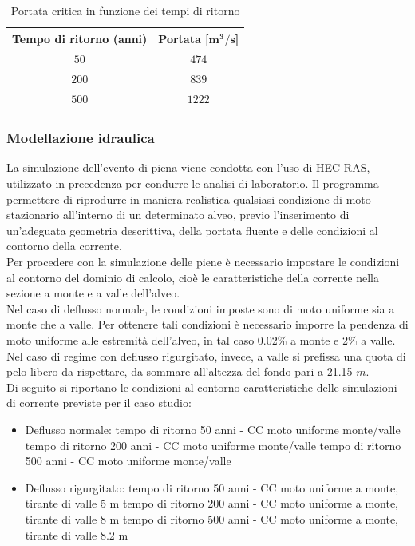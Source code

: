 \documentclass[12pt]{article} %
\begin{document}
\begin{table}[H]
    \centering
    \begin{tabular}{cc}
        \hline
        \textbf{Tempo di ritorno (anni)} & \textbf{Portata [$\mathbf{m^3/s}$]}\\
        \hline
        $50$ & $474$\\
        $200$ & $839$ \\
        $500$ & $1222$\\
        \hline
    \end{tabular}
    \caption{Portata critica in funzione dei tempi di ritorno}
\end{table}

\subsubsection{Modellazione idraulica}
\noindent La simulazione dell'evento di piena viene condotta con l'uso di HEC-RAS, utilizzato in precedenza per condurre le analisi di laboratorio. Il programma permettere di riprodurre in maniera realistica qualsiasi condizione di moto stazionario all'interno di un determinato alveo, previo l'inserimento di un'adeguata geometria descrittiva, della portata fluente e delle condizioni al contorno della corrente.\\
Per procedere con la simulazione delle piene è necessario impostare le condizioni al contorno del dominio di calcolo, cioè le caratteristiche della corrente nella sezione a monte e a valle dell'alveo.\\
Nel caso di deflusso normale, le condizioni imposte sono di moto uniforme sia a monte che a valle. Per ottenere tali condizioni è necessario imporre la pendenza di moto uniforme alle estremità dell'alveo, in tal caso 0.02\% a monte e 2\% a valle.\\
Nel caso di regime con deflusso rigurgitato, invece, a valle si prefissa una quota di pelo libero da rispettare, da sommare all'altezza del fondo pari a 21.15 $m$.\\
Di seguito si riportano le condizioni al contorno caratteristiche delle simulazioni di corrente previste per il caso studio:
\begin{itemize}
\item Deflusso normale:
    \subitem tempo di ritorno 50 anni - CC moto uniforme monte/valle
    \subitem tempo di ritorno 200 anni - CC moto uniforme monte/valle
    \subitem tempo di ritorno 500 anni - CC moto uniforme monte/valle
\item Deflusso rigurgitato:
\subitem tempo di ritorno 50 anni - CC moto uniforme a monte, tirante di valle 5 m
\subitem tempo di ritorno 200 anni - CC moto uniforme a monte, tirante di valle 8 m
\subitem tempo di ritorno 500 anni - CC moto uniforme a monte, tirante di valle 8.2 m

    
\end{itemize}
\end{document}

